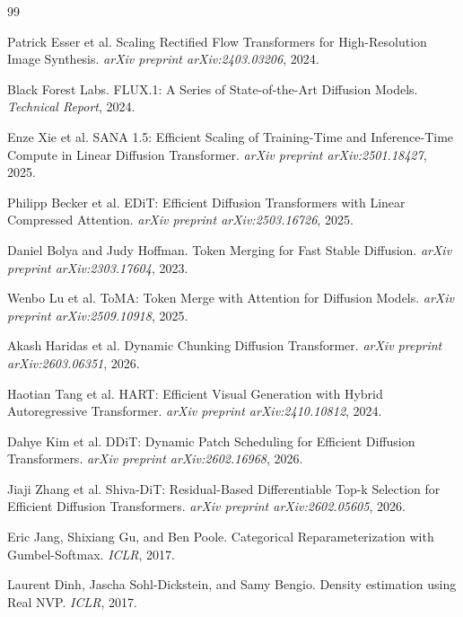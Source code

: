 \documentclass{article}
\begin{document}
\begin{thebibliography}{99}

    Patrick Esser et al.
    \newblock Scaling Rectified Flow Transformers for High-Resolution Image Synthesis.
    \newblock \emph{arXiv preprint arXiv:2403.03206}, 2024.

    Black Forest Labs.
    \newblock FLUX.1: A Series of State-of-the-Art Diffusion Models.
    \newblock \emph{Technical Report}, 2024.

    Enze Xie et al.
    \newblock SANA 1.5: Efficient Scaling of Training-Time and Inference-Time Compute in Linear Diffusion Transformer.
    \newblock \emph{arXiv preprint arXiv:2501.18427}, 2025.

    Philipp Becker et al.
    \newblock EDiT: Efficient Diffusion Transformers with Linear Compressed Attention.
    \newblock \emph{arXiv preprint arXiv:2503.16726}, 2025.

    Daniel Bolya and Judy Hoffman.
    \newblock Token Merging for Fast Stable Diffusion.
    \newblock \emph{arXiv preprint arXiv:2303.17604}, 2023.

    Wenbo Lu et al.
    \newblock ToMA: Token Merge with Attention for Diffusion Models.
    \newblock \emph{arXiv preprint arXiv:2509.10918}, 2025.

    Akash Haridas et al.
    \newblock Dynamic Chunking Diffusion Transformer.
    \newblock \emph{arXiv preprint arXiv:2603.06351}, 2026.

    Haotian Tang et al.
    \newblock HART: Efficient Visual Generation with Hybrid Autoregressive Transformer.
    \newblock \emph{arXiv preprint arXiv:2410.10812}, 2024.

    Dahye Kim et al.
    \newblock DDiT: Dynamic Patch Scheduling for Efficient Diffusion Transformers.
    \newblock \emph{arXiv preprint arXiv:2602.16968}, 2026.

    Jiaji Zhang et al.
    \newblock Shiva-DiT: Residual-Based Differentiable Top-k Selection for Efficient Diffusion Transformers.
    \newblock \emph{arXiv preprint arXiv:2602.05605}, 2026.

    Eric Jang, Shixiang Gu, and Ben Poole.
    \newblock Categorical Reparameterization with Gumbel-Softmax.
    \newblock \emph{ICLR}, 2017.

    Laurent Dinh, Jascha Sohl-Dickstein, and Samy Bengio.
    \newblock Density estimation using Real NVP.
    \newblock \emph{ICLR}, 2017.

\end{thebibliography}
\end{document}
